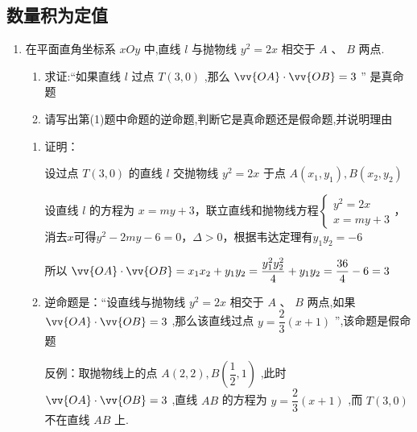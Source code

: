 \subsection*{数量积为定值}
\begin{enumerate}
    \item 在平面直角坐标系 ${xOy}$ 中,直线 $l$ 与抛物线 ${y}^{2} = {2x}$ 相交于 $A\text{ 、 }B$ 两点.
    \begin{enumerate}
        \item 求证:“如果直线 $l$ 过点 $T\left( {3,0}\right)$ ,那么 $\vv{OA} \cdot  \vv{OB} = 3$ ” 是真命题
        \item 请写出第(1)题中命题的逆命题,判断它是真命题还是假命题,并说明理由
    \end{enumerate}

    \begin{jieda}
        \begin{enumerate}
        \item 证明：
        
        设过点 $T\left( {3,0}\right)$ 的直线 $l$ 交抛物线 $y^2 = {2x}$ 于点 $A\left( {{x}_{1},{y}_{1}}\right) ,B\left( {{x}_{2},{y}_{2}}\right)$ 
        
        设直线 $l$ 的方程为 $x = my+3$，联立直线和抛物线方程$\left\{  \begin{array}{l} {y}^{2} = {2x} \\  
        x = my+3 \end{array}\right.$，消去$x$可得${y}^{2} - 2my - 6 = 0$，$\Delta > 0$，根据韦达定理有${y}_{1}{y}_{2} =  - 6$

        
        所以 $\vv{OA} \cdot  \vv{OB} = {x}_{1}{x}_{2} + {y}_{1}{y}_{2} = \dfrac{y_1^2y_2^2}{4} + {y}_{1}{y}_{2} = \dfrac{36}{4} - 6 = 3$
        \item 逆命题是：“设直线与抛物线 ${y^2} = {2x}$ 相交于 $A$ 、 $B$ 两点,如果 $\vv{OA} \cdot  \vv{OB} = 3$ ,那么该直线过点 $y = \dfrac{2}{3}\left( {x + 1}\right)$ ”,该命题是假命题
        
        反例：取抛物线上的点 $A\left( {2,2}\right) ,B\left( {\dfrac{1}{2},1}\right)$ ,此时 $\vv{OA} \cdot  \vv{OB} = 3$ ,直线 ${AB}$ 的方程为 $y = \dfrac{2}{3}\left( {x + 1}\right)$ ,而 $T\left( {3,0}\right)$ 不在直线 ${AB}$ 上.
    \end{enumerate}
    \end{jieda}

    \begin{vspace_}
    \vsp[4]
    \end{vspace_}


\end{enumerate}
